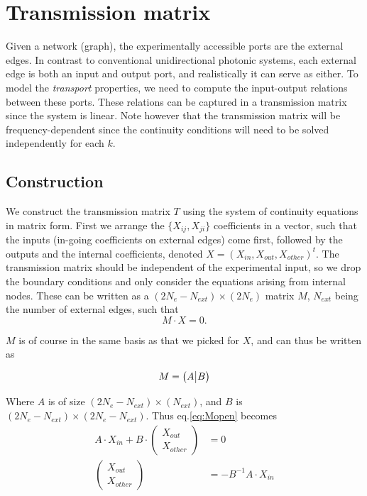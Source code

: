 \section{Transmission matrix}
Given a network (graph), the experimentally accessible ports are the external edges. In contrast to conventional unidirectional photonic systems, each external edge is both an input and output port, and realistically it can serve as either. To model the \textit{transport} properties, we need to compute the input-output relations between these ports. These relations can be captured in a transmission matrix since the system is linear. Note however that the transmission matrix will be frequency-dependent since the continuity conditions will need to be solved independently for each $k$.

\subsection{Construction}
We construct the transmission matrix $T$ using the system of continuity equations in matrix form. First we arrange the $\{X_{ij},X_{ji}\}$ coefficients in a vector, such that the inputs (in-going coefficients on external edges) come first, followed by the outputs and the internal coefficients, denoted $X = (X_{in}, X_{out}, X_{other})^t$. The transmission matrix should be independent of the experimental input, so we drop the boundary conditions and only consider the equations arising from internal nodes. These can be written as a $(2N_e-N_{ext}) \times (2N_e)$ matrix $M$, $N_{ext}$ being the number of external edges, such that 
\begin{equation}
    \label{eq:Mopen}
    M\cdot X = 0.
\end{equation}

$M$ is of course in the same basis as that we picked for $X$, and can thus be written as 

\begin{equation}
\label{eq:M_AB}
M = \big{(}A \big{\rvert} B \big{)}
\end{equation}

Where $A$ is of size $(2N_e-N_{ext}) \times (N_{ext})$, and $B$ is $(2N_e-N_{ext}) \times (2N_e-N_{ext})$. Thus eq.\ref{eq:Mopen} becomes
\begin{subequations}
\begin{align}
    A\cdot X_{in} + B\cdot \begin{pmatrix}X_{out}\\X_{other}  \end{pmatrix}  &= 0 \\
    \begin{pmatrix}X_{out}\\X_{other}  \end{pmatrix} &= -B^{-1}A \cdot X_{in}
\end{align}
\end{subequations}

